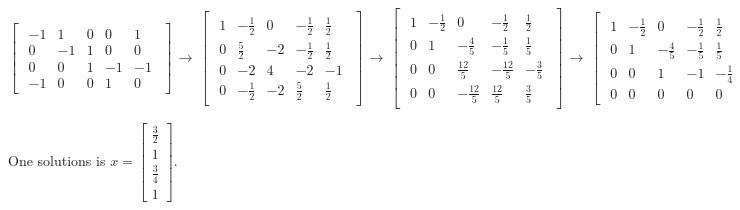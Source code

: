 \documentclass[11pt]{article}
\begin{document}
\(\begin{bmatrix}\begin{array}{cccc|c} -1 & 1 & 0 & 0 & 1 \\ 0 & -1 & 1 & 0 & 0 \\ 0 & 0 & 1 & -1 & -1 \\ -1 & 0 & 0 & 1 & 0 \end{array}\end{bmatrix}\,\to\,\begin{bmatrix}\begin{array}{cccc|c} 1 & -\frac{1}{2} & 0 & -\frac{1}{2} & \frac{1}{2} \\ 0 & \frac{5}{2} & -2 & -\frac{1}{2} & \frac{1}{2} \\ 0 & -2 & 4 & -2 & -1 \\ 0 & -\frac{1}{2} & -2 & \frac{5}{2} & \frac{1}{2} \end{array}\end{bmatrix}\,\to\,\begin{bmatrix}\begin{array}{cccc|c} 1 & -\frac{1}{2} & 0 & -\frac{1}{2} & \frac{1}{2} \\ 0 & 1 & -\frac{4}{5} & -\frac{1}{5} & \frac{1}{5} \\ 0 & 0 & \frac{12}{5} & -\frac{12}{5} & -\frac{3}{5} \\ 0 & 0 & -\frac{12}{5} & \frac{12}{5} & \frac{3}{5} \end{array}\end{bmatrix}\,\to\,\begin{bmatrix}\begin{array}{cccc|c} 1 & -\frac{1}{2} & 0 & -\frac{1}{2} & \frac{1}{2} \\ 0 & 1 & -\frac{4}{5} & -\frac{1}{5} & \frac{1}{5} \\ 0 & 0 & 1 & -1 & -\frac{1}{4} \\ 0 & 0 & 0 & 0 & 0 \end{array}\end{bmatrix}\)

One solutions is \(x = \begin{bmatrix} \frac{3}{2} \\ 1 \\ \frac{3}{4} \\ 1 \end{bmatrix}\).
\end{document}
